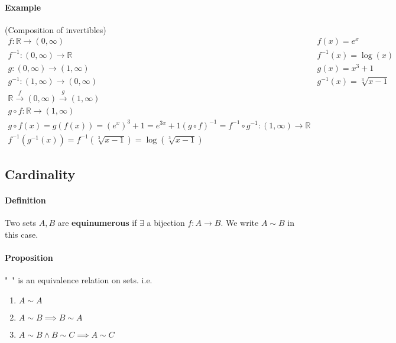 \documentclass{article}
\newcommand{\mapab}[2]{{#1}\xrightarrow{}{#2}}
\newcommand{\mapAb}[2]{\mathbb{#1}\xrightarrow{}{#2}}
\newcommand{\mapaB}[2]{{#1}\xrightarrow{}\mathbb{#2}}
\begin{document}
	\paragraph{Example}
	(Composition of invertibles)\newline
	\begin{align*}
	f:\mapAb{R}{(0,\infty)} & f(x) = e^x\\
	f^{-1}:\mapaB{(0,\infty)}{R} & f^{-1}(x) = \log(x)\\
	g:\mapab{(0,\infty)}{(1,\infty)} & g(x) = x^3+1\\
	g^{-1}:\mapab{(1,\infty)}{(0,\infty)} & g^{-1}(x) = \sqrt[3]{x-1}\\
	\mathbb{R}\xrightarrow{f}(0,\infty)\xrightarrow{g}(1,\infty)\\
	g\circ f:\mapAb{R}{(1,\infty)}\\
	g\circ f(x) = g(f(x)) = (e^x)^3+1 = e^{3x}+1
	(g\circ f)^{-1} = f^{-1}\circ g^{-1}:\mapaB{(1,\infty)}{R}\\
	f^{-1}(g^{-1}(x))=f^{-1}(\sqrt[3]{x-1})=\log(\sqrt[3]{x-1})
	\end{align*}
	\subsection{Cardinality}
	\paragraph{Definition}
	Two sets $A, B$ are \textbf{equinumerous} if $\exists$ a bijection $f:\mapab{A}{B}$. We write $A\sim B$ in this case.
	\paragraph{Proposition}
	"~" is an equivalence relation on sets. i.e.\newline
	\begin{enumerate}[label=(\roman*)]
		\item $A\sim A$\\
		\item $A\sim B \implies B\sim A$\\
		\item $A\sim B \land B\sim C \implies A\sim C$
	\end{enumerate}
\end{document}
